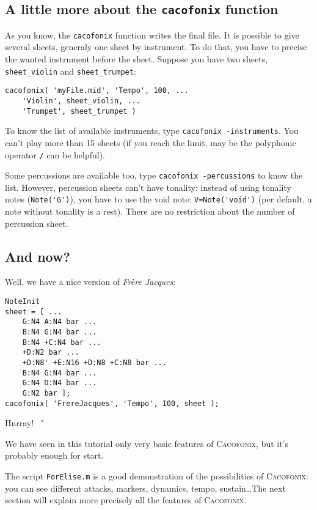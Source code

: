 \documentclass{article}
\newcommand\cacofonix{\textsc{Cacofonix}\xspace}
\newcommand\frerejaques{\emph{Fr\`ere Jacques}\xspace}
\newenvironment{meenv}{ \par \noindent \makebox[6em][r]{ \textcolor{mecolor}{Me}: " --~}}{~"}
\newcommand{ \me }[1]{%
\begin{meenv}%
	#1%
\end{meenv} }
\begin{document}
\subsection{A little more about the \lstinline!cacofonix! function}

As you know, the \lstinline!cacofonix! function writes the final file. It is possible to give several sheets, generaly one sheet by instrument. To do that, you have to precise the wanted instrument before the sheet. Suppose you have two sheets, \lstinline!sheet_violin! and \lstinline!sheet_trumpet!:
\begin{lstlisting}
cacofonix( 'myFile.mid', 'Tempo', 100, ...
	'Violin', sheet_violin, ...
	'Trumpet', sheet_trumpet )
\end{lstlisting}

To know the list of available instruments, type \lstinline!cacofonix -instruments!. You can't play more than 15 sheets (if you reach the limit, may be the polyphonic operator \lstinline!/! can be helpful).

Some percussions are available too, type \lstinline!cacofonix -percussions! to know the list. However, percussion sheets can't have tonality: instead of using tonality notes (\lstinline!Note('G')!), you have to use the void note: \lstinline!V=Note('void')! (per default, a note without tonality is a rest). There are no restriction about the number of percussion sheet.

\subsection{And now?}

Well, we have a nice version of \frerejaques:
\begin{lstlisting}
NoteInit
sheet = [ ...
	G:N4 A:N4 bar ...
	B:N4 G:N4 bar ...
	B:N4 +C:N4 bar ...
	+D:N2 bar ...
	+D:N8' +E:N16 +D:N8 +C:N8 bar ...
	B:N4 G:N4 bar ...
	G:N4 D:N4 bar ...
	G:N2 bar ];
cacofonix( 'FrereJacques', 'Tempo', 100, sheet );
\end{lstlisting}

\me{Hurray!}

We have seen in this tutorial only very basic features of \cacofonix, but it's probably enough for start.

The script \texttt{ForElise.m} is a good demonstration of the possibilities of \cacofonix: you can see different attacks, markers, dynamics, tempo, sustain\dots The next section will explain more precisely all the features of \cacofonix.
\end{document}
